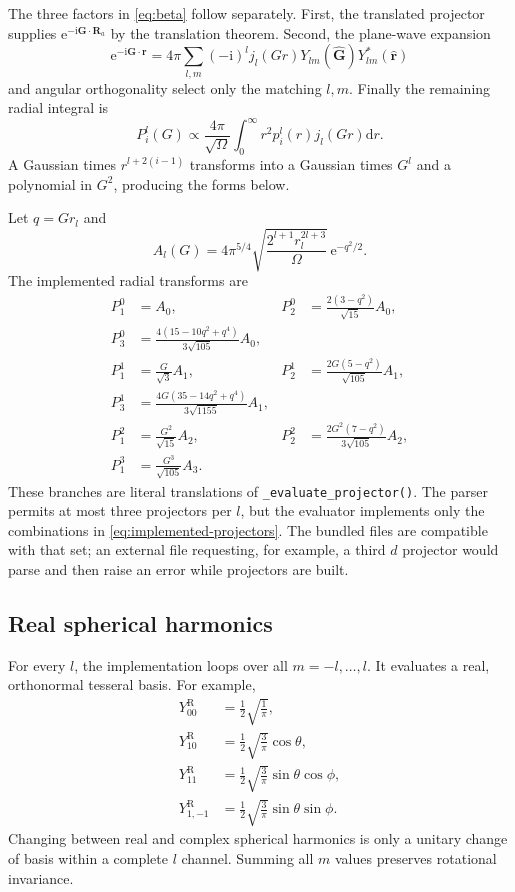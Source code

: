 \documentclass[10pt,twocolumn]{article}
\newcommand{\ii}{\mathrm{i}}
\newcommand{\e}{\mathrm{e}}
\newcommand{\dd}{\mathrm{d}}
\newcommand{\gvec}{\mathbf G}
\newcommand{\rvec}{\mathbf r}
\newcommand{\Rvec}{\mathbf R}
\newcommand{\code}[1]{\texttt{#1}}
\begin{document}
The three factors in \cref{eq:beta} follow separately.  First, the translated
projector supplies \(\e^{-\ii\gvec\cdot\Rvec_a}\) by the translation theorem.
Second, the plane-wave expansion
\begin{equation}
\e^{-\ii\gvec\cdot\rvec}
=4\pi\sum_{l,m}(-\ii)^l
j_l(Gr)Y_{lm}(\hat{\gvec})Y_{lm}^*(\hat{\rvec})
\end{equation}
and angular orthogonality select only the matching \(l,m\).  Finally the
remaining radial integral is
\begin{equation}
P_i^l(G)\propto
\frac{4\pi}{\sqrt\Omega}
\int_0^\infty r^2p_i^l(r)j_l(Gr)\dd r.
\end{equation}
A Gaussian times \(r^{l+2(i-1)}\) transforms into a Gaussian times
\(G^l\) and a polynomial in \(G^2\), producing the forms below.

Let \(q=Gr_l\) and
\begin{equation}
A_l(G)=4\pi^{5/4}
\sqrt{\frac{2^{l+1}r_l^{2l+3}}{\Omega}}\,
\e^{-q^2/2}.
\end{equation}
The implemented radial transforms are
\begin{align}
P_1^0&=A_0,&
P_2^0&=\frac{2(3-q^2)}{\sqrt{15}}A_0,\nonumber\\
P_3^0&=\frac{4(15-10q^2+q^4)}
{3\sqrt{105}}A_0,\nonumber\\
P_1^1&=\frac{G}{\sqrt3}A_1,&
P_2^1&=\frac{2G(5-q^2)}{\sqrt{105}}A_1,\nonumber\\
P_3^1&=\frac{4G(35-14q^2+q^4)}
{3\sqrt{1155}}A_1,\nonumber\\
P_1^2&=\frac{G^2}{\sqrt{15}}A_2,&
P_2^2&=\frac{2G^2(7-q^2)}
{3\sqrt{105}}A_2,\nonumber\\
P_1^3&=\frac{G^3}{\sqrt{105}}A_3.
\label{eq:implemented-projectors}
\end{align}
These branches are literal translations of
\code{\_evaluate\_projector()}.  The parser permits at most three projectors
per \(l\), but the evaluator implements only the combinations in
\cref{eq:implemented-projectors}.  The bundled files are compatible with
that set; an external file requesting, for example, a third \(d\) projector
would parse and then raise an error while projectors are built.

\subsection{Real spherical harmonics}

For every \(l\), the implementation loops over all
\(m=-l,\ldots,l\).  It evaluates a real, orthonormal tesseral basis.  For
example,
\begin{align}
Y_{00}^{\mathrm R}&=\frac{1}{2}\sqrt{\frac1\pi},\\
Y_{10}^{\mathrm R}&=\frac{1}{2}\sqrt{\frac3\pi}\cos\theta,\\
Y_{11}^{\mathrm R}&=\frac{1}{2}\sqrt{\frac3\pi}
\sin\theta\cos\phi,\\
Y_{1,-1}^{\mathrm R}&=\frac{1}{2}\sqrt{\frac3\pi}
\sin\theta\sin\phi.
\end{align}
Changing between real and complex spherical harmonics is only a unitary
change of basis within a complete \(l\) channel.  Summing all \(m\) values
preserves rotational invariance.
\end{document}
